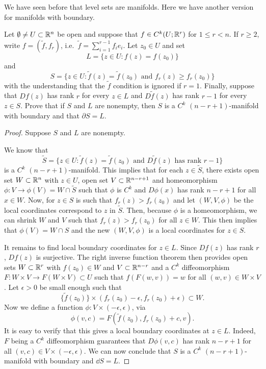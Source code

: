 \documentclass[a4paper]{article}
\begin{document}
We have seen before that level sets are manifolds. Here we have another
version for manifolds with boundary.
\begin{thm}
  Let $\emptyset \neq U \subset \mathbb{R}^n$ be open and suppose
  that $f\in C^k(U;\mathbb{R}^r)$ for $1 \le r < n$.  If $r \ge 2$,
  write $f = (\tilde{f},f_r)$, i.e.\ $\tilde{f} = \sum_{i=1}^
    {r-1} f_i e_i$.  Let $z_0 \in U$ and set
  \[
    L = \{ z \in U : f(z) = f(z_0) \}
  \]
  and
  \[
    S = \{ z \in U : \tilde{f}(z) = \tilde{f}(z_0) \text{ and }
    f_r(z) \ge f_r(z_0) \}
  \]
  with the understanding that the $\tilde{f}$ condition is ignored if
  $r=1$. Finally, suppose that $Df(z)$ has rank $r$ for every $z \in L$
  and $D \tilde{f}(z)$ has rank $r-1$ for every $z \in S$. Prove that if
  $S$ and $L$ are nonempty, then $S$ is a $C^k$ $(n-r+1)$-manifold with
  boundary and that $\partial S = L$.
\end{thm}

\begin{proof}
  Suppose $S$ and $L$ are nonempty.

  We know that
  \[
    \tilde{S} = \{z \in U : \tilde{f}(z) = \tilde{f} (z_0)
    \text{ and } D \tilde{f} (z) \text{ has rank $r - 1$}\}
  \]
  is a $C^k$ $(n - r + 1)$-manifold. This implies that for each $z \in
  \tilde{S}$, there exists open set $W \subset \mathbb{R}^n$ with $z \in U$, open
  set $V \subset \mathbb{R}^{n-r+1}$ and homeomorphism $\phi : V \to \phi(V) = W
  \cap \tilde{S}$ such that $\phi$ is $C^k$ and $D \phi(x)$ has rank
  $n-r+1$ for all $x \in W$. Now, for $z \in S$ is such that $f_r(z) >
  f_r(z_0)$ and let $(W, V, \phi)$ be the local coordinates correspond to
  $z$ in $\tilde{S}$. Then, because $\phi$ is a homeomorphism, we can
  shrink $W$ and $V$ such that $f_r(z) > f_r(z_0)$ for all $z \in W$. This
  then implies that $\phi(V) = W \cap S$ and the new $(W, V, \phi)$ is a
  local coordinates for $z \in S$.

  It remains to find local boundary coordinates for $z \in L$. Since
  $Df(z)$ has rank $r$, $Df(z)$ is surjective. The right inverse function
  theorem then provides open sets $W \subset \mathbb{R}^r$ with $f(z_0) \in W$ and
  $V \subset \mathbb{R}^{n - r}$ and a $C^k$ diffeomorphism $F : W \times V \to
  F(W \times V) \subset U$ such that $f(F(w, v)) = w$ for all $(w, v) \in
  W \times V$. Let $\epsilon > 0$ be small enough such that
  \[
    \{\tilde{f}(z_0)\} \times (f_r(z_0) - \epsilon,
    f_r(z_0) + \epsilon) \subset W.
  \]
  Now we define a function $\phi : V \times (- \epsilon, \epsilon)$, via
  \[
    \phi(v, c) = F(\tilde{f}(z_0), f_r(z_0) + c, v).
  \]
  It is easy to verify that this gives a local boundary coordinates at $z
  \in L$. Indeed, $F$ being a $C^k$ diffeomorphism guarantees that $D
  \phi(v, c)$ has rank $n - r + 1$ for all $(v, c) \in V \times
  (-\epsilon, \epsilon)$. We can now conclude that $S$ is a $C^k$ $(n - r
  + 1)$-manifold with boundary and $\dd S = L$.
\end{proof}
\end{document}
